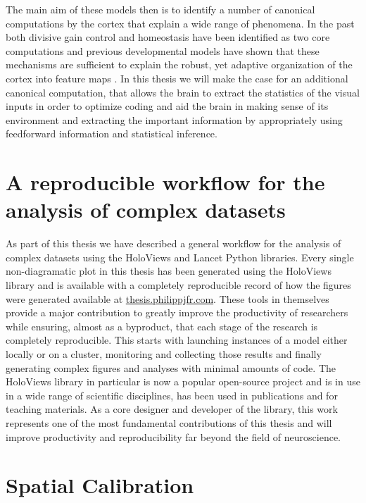 The main aim of these models then is to identify a number of canonical
computations by the cortex that explain a wide range of phenomena. In
the past both divisive gain control \citep{Carandini2012} and
homeostasis \citep{Marder2006} have been identified as two core
computations and previous developmental models have shown that these
mechanisms are sufficient to explain the robust, yet adaptive
organization of the cortex into feature maps \citep{Stevens2013}. In
this thesis we will make the case for an additional canonical
computation, that allows the brain to extract the statistics of the
visual inputs in order to optimize coding and aid the brain in making
sense of its environment and extracting the important information by
appropriately using feedforward information and statistical inference.

\section{A reproducible workflow for the analysis of complex datasets}

As part of this thesis we have described a general workflow for the
analysis of complex datasets using the HoloViews and Lancet Python
libraries. Every single non-diagramatic plot in this thesis has been
generated using the HoloViews library and is available with a
completely reproducible record of how the figures were generated
available at \url{thesis.philippjfr.com}. These tools in themselves
provide a major contribution to greatly improve the productivity of
researchers while ensuring, almost as a byproduct, that each stage of
the research is completely reproducible. This starts with launching
instances of a model either locally or on a cluster, monitoring and
collecting those results and finally generating complex figures and
analyses with minimal amounts of code. The HoloViews library in
particular is now a popular open-source project and is in use in a
wide range of scientific disciplines, has been used in publications
and for teaching materials. As a core designer and developer of the
library, this work represents one of the most fundamental
contributions of this thesis and will improve productivity and
reproducibility far beyond the field of neuroscience.

\section{Spatial Calibration}

